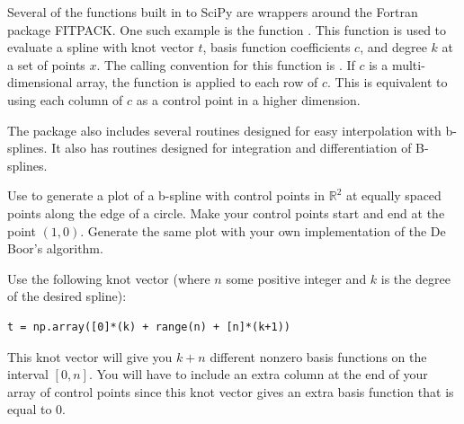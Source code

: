 Several of the functions built in to SciPy are wrappers around the Fortran package FITPACK.
One such example is the function .
This function is used to evaluate a spline with knot vector $t$, basis function coefficients $c$, and degree $k$ at a set of points $x$.
The calling convention for this function is .
If $c$ is a multi-dimensional array, the function is applied to each row of $c$.
This is equivalent to using each column of $c$ as a control point in a higher dimension.

The package  also includes several routines designed for easy interpolation with b-splines.
It also has routines designed for integration and differentiation of B-splines.

\begin{problem}
Use  to generate a plot of a b-spline with control points in $\mathbb{R}^2$ at equally spaced points along the edge of a circle.
Make your control points start and end at the point $\left(1, 0\right)$.
Generate the same plot with your own implementation of the De Boor's algorithm.

Use the following knot vector (where $n$ some positive integer and $k$ is the degree of the desired spline):
\begin{lstlisting}
t = np.array([0]*(k) + range(n) + [n]*(k+1))
\end{lstlisting}
This knot vector will give you $k + n$ different nonzero basis functions on the interval $\left[0, n\right]$.
You will have to include an extra column at the end of your array of control points since this knot vector gives an extra basis function that is equal to $0$.
\end{problem}
